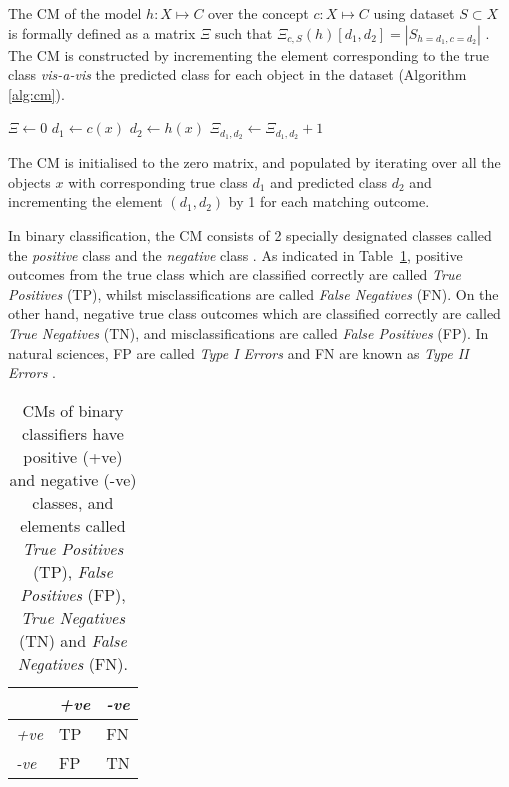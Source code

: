 The CM of the model $h : X \mapsto C$ over the concept $c : X \mapsto C$ using dataset $S \subset X$ is formally defined  as a matrix $\Xi$ such that $\Xi_{c,S}(h)[d_1,d_2] = |S_{h=d_1,c=d_2}|$ \citep{cichosz2014data}. The CM is constructed by incrementing the element corresponding to the true class \textit{vis-a-vis} the predicted class for each object in the dataset (Algorithm \ref{alg:cm}).

\begin{algorithm}
  \begin{algorithmic}
    \State $\Xi \gets 0$
      \State $d_1 \gets c(x)$
      \State $d_2 \gets h(x)$
      \State $\Xi_{d_1,d_2} \gets \Xi_{d_1,d_2} + 1$
    \EndFor
  \end{algorithmic}
  \caption{The CM is initialised to the zero matrix, and populated by iterating over all the objects $x$ with corresponding true class $d_1$ and predicted class $d_2$ and incrementing the element $(d_1,d_2)$ by 1 for each matching outcome.}
  \label{alg:cm}
\end{algorithm}

In binary classification, the CM consists of 2 specially designated classes called the \textit{positive} class and the \textit{negative} class \citep{saito2015precision}. As indicated in Table~\ref{tab:cm_binary}, positive outcomes from the true class  which are classified correctly are called \textit{True Positives} (TP), whilst misclassifications are called \textit{False Negatives} (FN). On the other hand, negative true class outcomes which are classified correctly are called \textit{True Negatives} (TN), and misclassifications are called \textit{False Positives} (FP). In natural sciences, FP are called \textit{Type I Errors} and FN are known as \textit{Type II Errors} \citep{fielding1997review}.

\begin{table}[ht]
  \centering
  \selectfont
  \begin{tabular}{lll}
    \toprule
                  & \textit{+ve} & \textit{-ve} \\
    \midrule
    \textit{+ve}  & TP           & FN \\
    \textit{-ve}  & FP           & TN \\
    \bottomrule
  \end{tabular}
  \caption{CMs of binary classifiers have positive (+ve) and negative (-ve) classes, and elements called \textit{True Positives} (TP), \textit{False Positives} (FP), \textit{True Negatives} (TN) and \textit{False Negatives} (FN).}
  \label{tab:cm_binary}
\end{table}
\vspace{2mm}

